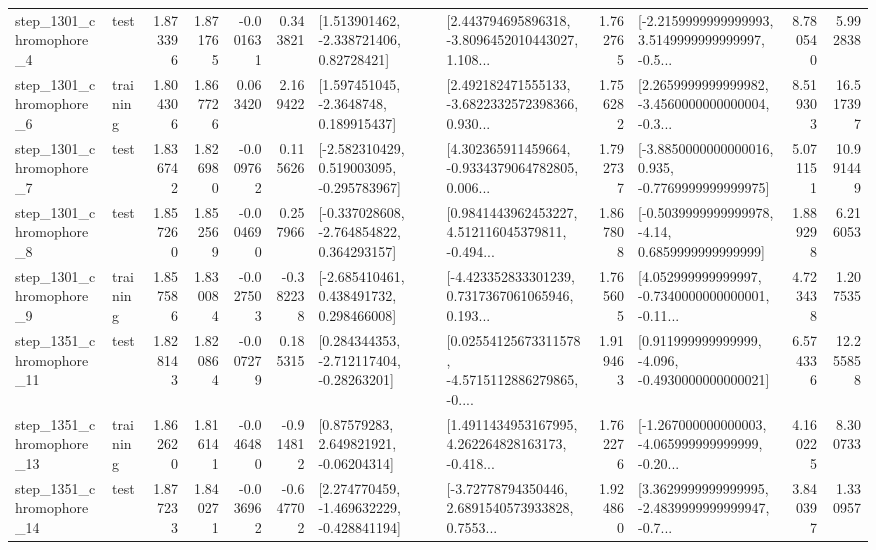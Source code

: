 \begin{tabular}{llrrrrllrlrr}
  step\_1301\_chromophore\_4 &      test &      1.873396 &    1.871765 &     -0.001631 &  0.343821 &     [1.513901462, -2.338721406, 0.82728421] &  [2.443794695896318, -3.8096452010443027, 1.108... &       1.762765 &  [-2.2159999999999993, 3.5149999999999997, -0.5... &            8.780540 &          5.992838 \\
  step\_1301\_chromophore\_6 &  training &      1.804306 &    1.867726 &      0.063420 &  2.169422 &      [1.597451045, -2.3648748, 0.189915437] &  [2.492182471555133, -3.6822332572398366, 0.930... &       1.756282 &  [2.2659999999999982, -3.4560000000000004, -0.3... &            8.519303 &         16.517397 \\
  step\_1301\_chromophore\_7 &      test &      1.836742 &    1.826980 &     -0.009762 &  0.115626 &   [-2.582310429, 0.519003095, -0.295783967] &  [4.302365911459664, -0.9334379064782805, 0.006... &       1.792737 &  [-3.8850000000000016, 0.935, -0.7769999999999975] &            5.071151 &         10.991449 \\
  step\_1301\_chromophore\_8 &      test &      1.857260 &    1.852569 &     -0.004690 &  0.257966 &   [-0.337028608, -2.764854822, 0.364293157] &  [0.9841443962453227, 4.512116045379811, -0.494... &       1.867808 &   [-0.5039999999999978, -4.14, 0.6859999999999999] &            1.889298 &          6.216053 \\
  step\_1301\_chromophore\_9 &  training &      1.857586 &    1.830084 &     -0.027503 & -0.382238 &    [-2.685410461, 0.438491732, 0.298466008] &  [-4.423352833301239, 0.7317367061065946, 0.193... &       1.765605 &  [4.052999999999997, -0.7340000000000001, -0.11... &            4.723438 &          1.207535 \\
 step\_1351\_chromophore\_11 &      test &      1.828143 &    1.820864 &     -0.007279 &  0.185315 &    [0.284344353, -2.712117404, -0.28263201] &  [0.02554125673311578, -4.5715112886279865, -0.... &       1.919463 &   [0.911999999999999, -4.096, -0.4930000000000021] &            6.574336 &         12.255858 \\
 step\_1351\_chromophore\_13 &  training &      1.862620 &    1.816141 &     -0.046480 & -0.914812 &      [0.87579283, 2.649821921, -0.06204314] &  [1.4911434953167995, 4.262264828163173, -0.418... &       1.762276 &  [-1.267000000000003, -4.065999999999999, -0.20... &            4.160225 &          8.300733 \\
 step\_1351\_chromophore\_14 &      test &      1.877233 &    1.840271 &     -0.036962 & -0.647702 &   [2.274770459, -1.469632229, -0.428841194] &  [-3.72778794350446, 2.6891540573933828, 0.7553... &       1.924860 &  [3.3629999999999995, -2.4839999999999947, -0.7... &            3.840397 &          1.330957 \\

\end{tabular}
